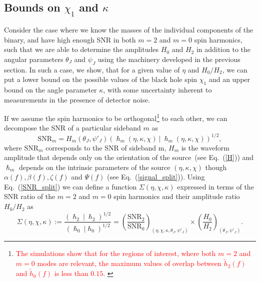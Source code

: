\documentclass[preprint,onecolumn,,tightenlines,superscriptaddress,showpacs,nofootinbib,eqsecnum,amsfonts,amsmath]{revtex4}
\def\red#1{\textcolor{red}{#1}}
\begin{document}
\subsection{Bounds on $\chi_1$ and $\kappa$} 

Consider the case where we know the masses of the individual components of the
binary, and have high enough SNR in  both $m=2$ and $m=0$ spin harmonics, such
that we are able to determine the amplitudes $H_{0}$ and $H_{2}$ in  addition to
the angular parameters $\theta_{J}$ and $\psi_{J}$ using the machinery developed
in the previous section. In such a case, we show, that for a given value of
$\eta$ and $H_{0}/H_{2}$, we can put a lower bound on the possible  values of
the black hole spin $\chi_{1}$ and an upper bound on the angle parameter
$\kappa$, with some uncertainty inherent  to measurements in the presence of
detector noise. 

If we assume the spin harmonics to be orthogonal\footnote{\red{The simulations
show that for the regions of interest, where both  $m=2$ and $m=0$ modes are
relevant, the maximum values of overlap between $\tilde h_2(f)$ and $\tilde
h_0(f)$ is less than $0.15$. }}  to each other, we can decompose the SNR of a
particular sideband $m$ as
\begin{equation}
\text{SNR}_{m} = H_{m} (\theta_{J}, \psi'_J) (\hslash_{m}(\eta, \kappa,\chi)~|~\hslash_{m}(\eta, \kappa,\chi))^{1/2},
\label{SNR_split}
\end{equation}
where $\text{SNR}_{m}$ corresponds to the SNR of sideband m, $H_{m}$ is the
waveform amplitude that depends only on the orientation of the source~(see
Eq.~(\ref{H})) and  $\hslash_{m}$ depends on the intrinsic parameters of the
source $(\eta, \kappa,\chi)$ though $\alpha(f), \beta(f), \zeta(f)$ and
$\Psi(f)$ (see Eq.~(\ref{signal_split})). Using Eq.~(\ref{SNR_split}) we can
define a  function $\Sigma(\eta, \chi, \kappa)$ expressed in terms of the SNR
ratio of the $m=2$ and $m=0$ spin harmonics and their amplitude ratio
$H_{0}/H_{2}$ as
\begin{equation}
\Sigma(\eta, \chi, \kappa):=\frac{(\hslash_{2}~|~\hslash_{2})^{1/2}}{(\hslash_{0}~| \hslash_{0})^{1/2}} =
\left(\frac{\text{SNR}_{2}}{\text{SNR}_{0}}\right)_{(\eta, 
\chi,
\kappa, \theta_J, \psi'_J)} \times \left(\frac{H_{0}}{H_{2}}\right)_{(\theta_{J}, \psi'_J)}.
\label{Sigma}
\end{equation}
\end{document}
